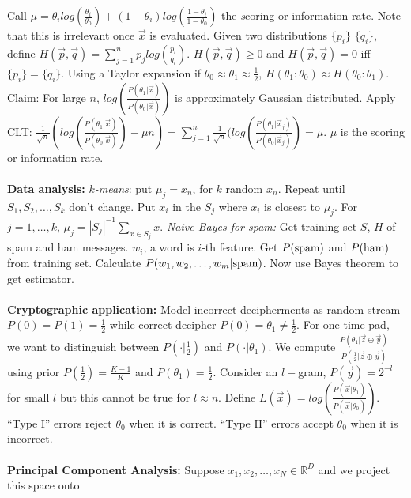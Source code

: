 Call $\mu= \theta_i log({\frac {\theta_i} {\theta_0}}) + (1-\theta_i)
log({\frac {1-\theta_i} {1-\theta_0}})
$ the {\emph scoring or information rate}.  Note that this is irrelevant once ${\vec x}$ is
evaluated.
Given two distributions 
$\{p_i \}$
$\{q_i \}$, define $H({\vec p}, {\vec q})= \sum_{j=1}^n p_j log({\frac {p_i} {q_i}})$.
$H({\vec p}, {\vec q}) \ge 0$ and
$H({\vec p}, {\vec q}) = 0$ iff 
$\{p_i \}= \{q_i \}$.  
Using a Taylor expansion if $\theta_0 \approx \theta_1 \approx {\frac 1 2}$,
$ H(\theta_1:\theta_0) \approx H(\theta_0:\theta_1)$.
Claim: For large $n$, 
$log({\frac {P(\theta_1|{\vec x})} {P(\theta_0|{\vec x})}})$ is approximately 
Gaussian distributed.  Apply CLT:
$
{\frac 1 {\sqrt n}} (log({\frac {P(\theta_1|{\vec x})} {P(\theta_0|{\vec x})}})- \mu n)=
\sum_{j=1}^n {\frac 1 {\sqrt n}} (log({\frac {P(\theta_1|{\vec x}_j)} {P(\theta_0|{\vec x}_j)}})= \mu$.
$\mu$ is the scoring or information rate.
\\
\\
{\bf Data analysis:} \emph{$k$-means}: put $\mu_j=x_n$, for $k$ random $x_n$.  
Repeat until $S_1 , S_2 , \ldots , S_k$ don't change.  Put $x_i$ in the 
$S_j$ where $x_i$ is closest to $\mu_j$.  For $j= 1, \ldots, k$,
$\mu_j= |S_j|^{-1} \sum_{x \in S_j} x$. \emph{Naive Bayes for spam:} Get training set
$S$, $H$ of spam and ham messages.  $w_i$, a word is $i$-th feature.  Get 
$P(\textnormal{spam})$ and $P(\textnormal{ham})$ from training set.  
Calculate $P(w_1, w_2, \ldots, w_m|\textnormal{spam})$.  Now use Bayes theorem to get
estimator.
\\
\\
{\bf Cryptographic application:}
Model incorrect decipherments as random stream $P(0)=P(1)= {\frac 1 2}$ while correct decipher
$P(0)=\theta_1 \ne  {\frac 1 2}$.  For one time pad, we want to distinguish between
$P(\cdot | {\frac 1 2})$ and
$P(\cdot | \theta_1)$.  We compute 
${\frac 
{P(\theta_1| {\vec z} \oplus {\vec y})}
{P( {\frac 1 2} | {\vec z} \oplus {\vec y})}}$ using prior 
$P({\frac 1 2})= {\frac {K-1} {K}}$ and
$P(\theta_1)= {\frac 1 2}$.  
Consider an $l-$gram, $P({\vec y})= 2^{-l}$ for small $l$ but this cannot be true for
$l \approx n$.  Define
$L({\vec x})= log({\frac {P({\vec x}|\theta_1)} {P({\vec x}|\theta_0)}})$.  
``Type I'' errors reject $\theta_0$ when it is correct.
``Type II'' errors accept $\theta_0$ when it is incorrect.
\\
\\
{\bf Principal Component Analysis:}
Suppose $x_1 , x_2 , \ldots , x_N \in {\mathbb R}^D$ and
we project this space onto\\
